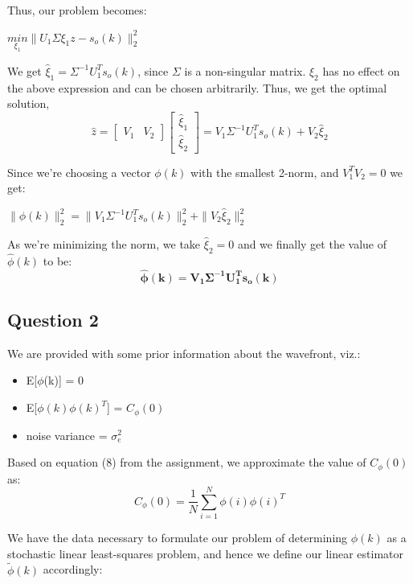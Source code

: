 \documentclass[12pt]{report}
\begin{document}
Thus, our problem becomes:

$\underset{\xi_{1}}{min} \| U_{1}\Sigma\xi_{1}z - s_{o}(k)\|_{2}^{2}$

We get $\hat\xi_{1} = \Sigma^{-1}U_{1}^{T}s_{o}(k)$, since $\Sigma$ is a non-singular matrix. $\xi_{2}$ has no effect on the above expression and can be chosen arbitrarily. Thus, we get the optimal solution,
\begin{equation*}
\hat{z} = \begin{bmatrix}
V_{1} & V_{2}
\end{bmatrix}
\begin{bmatrix}
\hat\xi_{1} \\
\hat\xi_{2}
\end{bmatrix}
= V_{1}\Sigma^{-1}U_{1}^{T}s_{o}(k) + V_{2}\hat\xi_{2}
\end{equation*}

Since we're choosing a vector $\phi(k)$ with the smallest 2-norm, and $V_{1}^{T}V_{2} = 0$ we get:

$\|\phi(k)\|_{2}^{2} = \| V_{1}\Sigma^{-1}U_{1}^{T}s_{o}(k)\|_{2}^{2} + \| V_{2}\hat\xi_{2} \|_{2}^{2}$

As we're minimizing the norm, we take $\hat\xi_{2} = 0$ and we finally get the value of $\hat\phi(k)$ to be:
\begin{equation*}
\mathbf{\hat\phi(k) = V_{1}\Sigma^{-1}U_{1}^{T}s_{o}(k)}
\end{equation*}

\subsection*{Question 2}

We are provided with some prior information about the wavefront, viz.:

\begin{itemize}
	\item E[$\phi$(k)] = 0
	\item E[$\phi(k)\phi(k)^T$] = $C_{\phi}(0)$
	\item noise variance = $\sigma_{e}^{2}$
\end{itemize}
  
Based on equation (8) from the assignment, we approximate the value of $C_{\phi}(0)$ as:
\begin{equation}\label{eq:cPhi}
C_{\phi}(0) = \frac{1}{N}\sum_{i=1}^{N}\phi(i)\phi(i)^T
\end{equation}

We have the data necessary to formulate our problem of determining $\phi(k)$ as a stochastic linear least-squares problem, and hence we define our linear estimator $\tilde{\phi}(k)$ accordingly:
\end{document}
